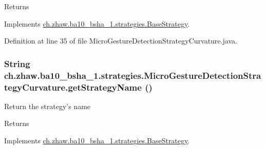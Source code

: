 \begin{DoxyReturn}{Returns}

\end{DoxyReturn}


Implements \hyperlink{classch_1_1zhaw_1_1ba10__bsha__1_1_1strategies_1_1BaseStrategy_a75fdb36932ad701f6375cc1fe718056b}{ch.zhaw.ba10\_\-bsha\_\-1.strategies.BaseStrategy}.

Definition at line 35 of file MicroGestureDetectionStrategyCurvature.java.\hypertarget{classch_1_1zhaw_1_1ba10__bsha__1_1_1strategies_1_1MicroGestureDetectionStrategyCurvature_acd5003f685af87709425848adde5bc0f}{
\subsubsection[{getStrategyName}]{\setlength{\rightskip}{0pt plus 5cm}String ch.zhaw.ba10\_\-bsha\_\-1.strategies.MicroGestureDetectionStrategyCurvature.getStrategyName ()}}
\label{classch_1_1zhaw_1_1ba10__bsha__1_1_1strategies_1_1MicroGestureDetectionStrategyCurvature_acd5003f685af87709425848adde5bc0f}
Return the strategy's name

\begin{DoxyReturn}{Returns}

\end{DoxyReturn}


Implements \hyperlink{classch_1_1zhaw_1_1ba10__bsha__1_1_1strategies_1_1BaseStrategy_aa0ebed55eed45409bad13d43a0058780}{ch.zhaw.ba10\_\-bsha\_\-1.strategies.BaseStrategy}.

